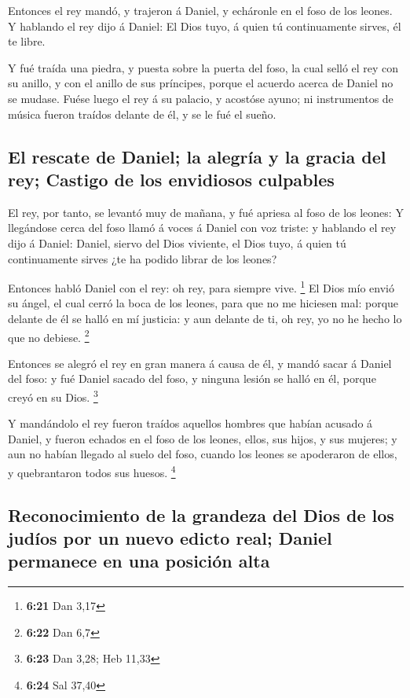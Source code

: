  Entonces el rey mandó, y trajeron á Daniel, y echáronle en
el foso de los leones. Y hablando el rey dijo á Daniel: El Dios tuyo, á
quien tú continuamente sirves, él te libre.

 Y fué traída una piedra, y puesta sobre la puerta del
foso, la cual selló el rey con su anillo, y con el anillo de sus
príncipes, porque el acuerdo acerca de Daniel no se mudase.
 Fuése luego el rey á su palacio, y acostóse ayuno; ni
instrumentos de música fueron traídos delante de él, y se le fué el
sueño.

\hypertarget{el-rescate-de-daniel-la-alegruxeda-y-la-gracia-del-rey-castigo-de-los-envidiosos-culpables}{%
\subsection{El rescate de Daniel; la alegría y la gracia del rey;
Castigo de los envidiosos
culpables}\label{el-rescate-de-daniel-la-alegruxeda-y-la-gracia-del-rey-castigo-de-los-envidiosos-culpables}}

 El rey, por tanto, se levantó muy de mañana, y fué apriesa
al foso de los leones:  Y llegándose cerca del foso llamó á
voces á Daniel con voz triste: y hablando el rey dijo á Daniel: Daniel,
siervo del Dios viviente, el Dios tuyo, á quien tú continuamente sirves
¿te ha podido librar de los leones?

 Entonces habló Daniel con el rey: oh rey, para siempre
vive. \footnote{\textbf{6:21} Dan 3,17}  El Dios mío envió
su ángel, el cual cerró la boca de los leones, para que no me hiciesen
mal: porque delante de él se halló en mí justicia: y aun delante de ti,
oh rey, yo no he hecho lo que no debiese. \footnote{\textbf{6:22} Dan
  6,7}

 Entonces se alegró el rey en gran manera á causa de él, y
mandó sacar á Daniel del foso: y fué Daniel sacado del foso, y ninguna
lesión se halló en él, porque creyó en su Dios. \footnote{\textbf{6:23}
  Dan 3,28; Heb 11,33}

 Y mandándolo el rey fueron traídos aquellos hombres que
habían acusado á Daniel, y fueron echados en el foso de los leones,
ellos, sus hijos, y sus mujeres; y aun no habían llegado al suelo del
foso, cuando los leones se apoderaron de ellos, y quebrantaron todos sus
huesos. \footnote{\textbf{6:24} Sal 37,40}

\hypertarget{reconocimiento-de-la-grandeza-del-dios-de-los-juduxedos-por-un-nuevo-edicto-real-daniel-permanece-en-una-posiciuxf3n-alta}{%
\subsection{Reconocimiento de la grandeza del Dios de los judíos por un
nuevo edicto real; Daniel permanece en una posición
alta}\label{reconocimiento-de-la-grandeza-del-dios-de-los-juduxedos-por-un-nuevo-edicto-real-daniel-permanece-en-una-posiciuxf3n-alta}}

